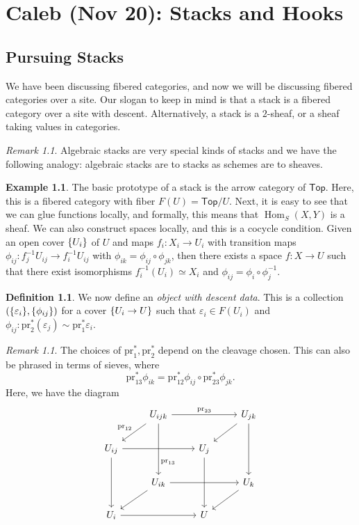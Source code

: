 \documentclass[leqno, openany]{memoir}
\theoremstyle{definition}
\newtheorem{defn}[thm]{Definition}
\newtheorem{exm}[thm]{Example}
\theoremstyle{remark}
\newtheorem{rmk}[thm]{Remark}
\theoremstyle{plain}
\theoremstyle{definition}
\theoremstyle{remark}
\newcommand{\ep}{\varepsilon}
\newcommand{\mr}[1]{\mathrm{#1}}
\newcommand{\ms}[1]{\mathsf{#1}}
\DeclareMathOperator{\Hom}{Hom}
\begin{document}
\chapter{Caleb (Nov 20): Stacks and Hooks}%
\label{cha:caleb_nov_20_stacks_and_hooks}

\section{Pursuing Stacks}%

We have been discussing fibered categories, and now we will be discussing
fibered categories over a site. Our slogan to keep in mind is that a stack is a
fibered category over a site with descent. Alternatively, a stack is a
$2$-sheaf, or a sheaf taking values in categories.

\begin{rmk} Algebraic stacks are very special kinds of stacks and we have the
following analogy: algebraic stacks are to stacks as schemes are to sheaves.
\end{rmk}

\begin{exm} The basic prototype of a stack is the arrow category of $\ms{Top}$.
    Here, this is a fibered category with fiber $F(U) = \ms{Top}/U$. Next, it
    is easy to see that we can glue functions locally, and formally, this means
    that $\Hom_S(X,Y)$ is a sheaf. We can also construct spaces locally, and
    this is a cocycle condition. Given an open cover $\qty{U_i}$ of $U$ and
    maps $f_i \colon X_i \to U_i$ with transition maps $\phi_{ij} \colon
    f_j^{-1} U_{ij} \to f_i^{-1} U_{ij}$ with $\phi_{ik} = \phi_{ij} \circ
    \phi_{jk}$, then there exists a space $f \colon X \to U$ such that there
    exist isomorphisms $f_i^{-1}(U_i) \simeq X_i$ and $\phi_{ij} = \phi_i \circ
    \phi_j^{-1}$.  \end{exm}

\begin{defn} We now define an \textit{object with descent data}. This is a
    collection $(\qty{\ep_i}, \qty{\phi_{ij}})$ for a cover $\qty{U_i \to U}$
    such that $\ep_i \in F(U_i)$ and $\phi_{ij} \colon \mr{pr}_2^*(\ep_j) \sim
    \mr{pr}_1^* \ep_i$.  \end{defn}

\begin{rmk} The choices of $\mr{pr}_1^*, \mr{pr}_2^*$ depend on the cleavage
    chosen. This can also be phrased in terms of sieves, where \[
    \mr{pr}_{13}^* \phi_{ik} = \mr{pr}_{12}^* \phi_{ij} \circ \mr{pr}_{23}^*
\phi_{jk}. \] Here, we have the diagram \begin{equation*} \begin{tikzcd} &
U_{ijk} \arrow[near end]{dd}{\mr{pr}_{13}} \arrow[swap]{dl}{\mr{pr}_{12}}
\arrow{rr}{\mr{pr}_{23}} & & U_{jk} \arrow{dl} \arrow{dd} \\ U_{ij} \arrow{rr}
\arrow{dd} & & U_j \arrow{dd} \\ & U_{ik} \arrow{rr} \arrow{dl} & & U_k
\arrow{dl} \\ U_i \arrow{rr} & & U \end{tikzcd} \end{equation*} \end{rmk}
\end{document}
